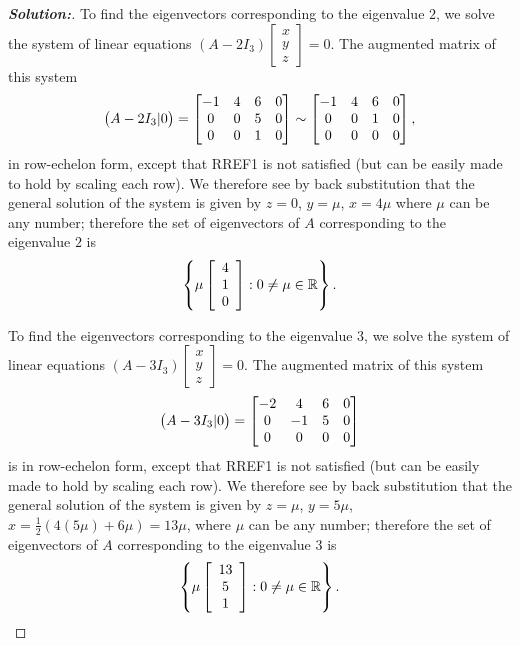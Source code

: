 \documentclass[a4paper]{amsart}
\theoremstyle{definition}
\newenvironment{solution}{\begin{proof}[\textbf{Solution:}] \vphantom{u}}{\end{proof}}
\begin{document}
\begin{solution}
 To find the eigenvectors corresponding to the eigenvalue $2$, we
 solve the system of linear equations $(A - 2I_3)\left[
 \begin{array}{c}x \\ y\\z
 \end{array} \right] = 0$. The augmented matrix of this system
 \[
 \big(A - 2I_3|0\big) = \left[\begin{matrix} -1& 4&
 6&0\\0&0&5&0\\0&0&1&0\end{matrix}\right] \sim \left[\begin{matrix} -1& 4&
 6&0\\0&0&1&0\\0&0&0&0\end{matrix}\right],
 \]
 in row-echelon form, except that RREF1 is not satisfied (but
 can be easily made to hold by scaling each row).
 We therefore see by back substitution that
 the general solution of the system is given by $z = 0$, $y = \mu$,
 $x = 4\mu$ where $\mu$ can be any number; therefore the set of
 eigenvectors of $A$ corresponding to the eigenvalue $2$ is
 \[
 \left\{ \mu \left[ \begin{array}{c} 4\\1\\0
 \end{array} \right] : 0 \neq \mu \in {\mathbb{R}} \right\}.
 \]

 To find the eigenvectors corresponding to the eigenvalue $3$, we
 solve the system of linear equations $(A - 3I_3)\left[
 \begin{array}{c}x \\ y\\z
 \end{array} \right] = 0$. The augmented matrix of this system
 \[
 \big(A - 3I_3|0\big) = \left[\begin{matrix} -2& 4&
 6&0\\0&-1&5&0\\0&0&0&0\end{matrix}\right]
 \]
 is in row-echelon form, except that RREF1 is not satisfied (but
 can be easily made to hold by scaling each row).
 We therefore see by back substitution that
 the general solution of the system is given by $z = \mu$, $y =
 5\mu$, $x = \frac{1}{2}(4(5\mu) + 6\mu) = 13\mu$,  where $\mu$ can
 be any number; therefore the set of eigenvectors of $A$
 corresponding to the eigenvalue $3$ is
 \[
 \left\{ \mu \left[ \begin{array}{c} 13\\5\\1
 \end{array} \right] : 0 \neq \mu \in {\mathbb{R}} \right\}.
 \]
\end{solution}
\end{document}
